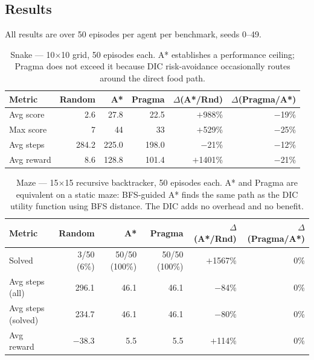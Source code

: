 \documentclass[11pt,letterpaper]{article}
\begin{document}
\subsection{Results}

All results are over 50 episodes per agent per benchmark, seeds 0--49.

\begin{table}[H]
\centering
\begin{tabular}{lrrrrr}
\toprule
\textbf{Metric} & \textbf{Random} & \textbf{A*} & \textbf{Pragma} & \textbf{$\Delta$(A*/Rnd)} & \textbf{$\Delta$(Pragma/A*)} \\
\midrule
Avg score  & 2.6   & 27.8  & 22.5  & $+$988\%  & $-$19\% \\
Max score  & 7     & 44    & 33    & $+$529\%  & $-$25\% \\
Avg steps  & 284.2 & 225.0 & 198.0 & $-$21\%   & $-$12\% \\
Avg reward & 8.6   & 128.8 & 101.4 & $+$1401\% & $-$21\% \\
\bottomrule
\end{tabular}
\caption{Snake --- 10$\times$10 grid, 50 episodes each. A* establishes a
performance ceiling; Pragma does not exceed it because DIC risk-avoidance
occasionally routes around the direct food path.}
\label{tab:snake}
\end{table}

\begin{table}[H]
\centering
\begin{tabular}{lrrrrr}
\toprule
\textbf{Metric} & \textbf{Random} & \textbf{A*} & \textbf{Pragma} & \textbf{$\Delta$(A*/Rnd)} & \textbf{$\Delta$(Pragma/A*)} \\
\midrule
Solved             & 3/50 (6\%)  & 50/50 (100\%) & 50/50 (100\%) & $+$1567\% & 0\%     \\
Avg steps (all)    & 296.1       & 46.1          & 46.1          & $-$84\%   & 0\%     \\
Avg steps (solved) & 234.7       & 46.1          & 46.1          & $-$80\%   & 0\%     \\
Avg reward         & $-$38.3     & 5.5           & 5.5           & $+$114\%  & 0\%     \\
\bottomrule
\end{tabular}
\caption{Maze --- 15$\times$15 recursive backtracker, 50 episodes each. A* and
Pragma are equivalent on a static maze: BFS-guided A* finds the same path as the
DIC utility function using BFS distance. The DIC adds no overhead and no benefit.}
\label{tab:maze}
\end{table}
\end{document}
